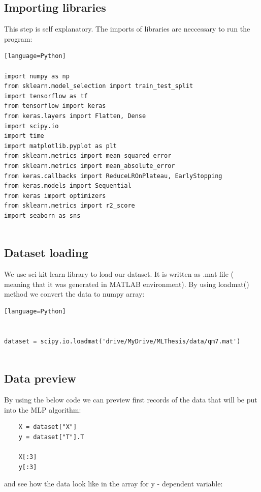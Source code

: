 \documentclass[a4paper,oneside,openright,11pt]{book}
\begin{document}
\subsection{Importing libraries}

This step is self explanatory. The imports of libraries are neccessary to run the program:

\begin{verbatim}[language=Python]

import numpy as np
from sklearn.model_selection import train_test_split
import tensorflow as tf
from tensorflow import keras
from keras.layers import Flatten, Dense
import scipy.io
import time
import matplotlib.pyplot as plt
from sklearn.metrics import mean_squared_error
from sklearn.metrics import mean_absolute_error
from keras.callbacks import ReduceLROnPlateau, EarlyStopping
from keras.models import Sequential
from keras import optimizers
from sklearn.metrics import r2_score
import seaborn as sns


\end{verbatim}


\subsection{Dataset loading}

We use sci-kit learn library to load our dataset. It is written as .mat file ( meaning that it was generated in MATLAB environment). By using loadmat() method we convert the data to numpy array:

\begin{verbatim}[language=Python]


dataset = scipy.io.loadmat('drive/MyDrive/MLThesis/data/qm7.mat')


\end{verbatim}


\subsection{Data preview}

By using the below code we can preview first records of the data that will be put into the MLP algorithm:

\begin{verbatim}
    X = dataset["X"]
    y = dataset["T"].T

    X[:3]
    y[:3]
\end{verbatim}

and see how the data look like in the array for y - dependent variable:
\end{document}
